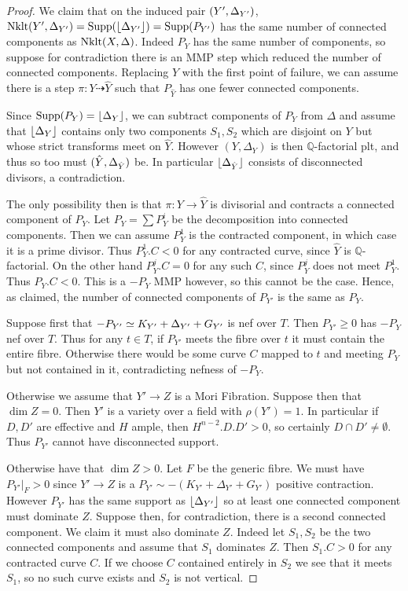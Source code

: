 \begin{proof}
	We claim that on the induced pair $(Y',\Delta_{Y'})$, $\textup{Nklt}(Y',\Delta_{Y'})=\text{Supp}(\lfloor \Delta_{Y'} \rfloor)=\text{Supp}(P_{Y'})$ has the same number of connected components as $\textup{Nklt}(X,\Delta)$. Indeed $P_{Y}$ has the same number of components, so suppose for contradiction there is an MMP step which reduced the number of connected components. Replacing $Y$ with the first point of failure, we can assume there is a step $\pi: Y \dashrightarrow \hat{Y}$ such that $P_{\hat{Y}}$ has one fewer connected components. 
	
	Since $\text{Supp}(P_{Y})=\lfloor \Delta_{Y} \rfloor$, we can subtract components of $P_{Y}$ from $\Delta$ and assume that $\lfloor \Delta_{Y} \rfloor$ contains only two components $S_{1}, S_{2}$ which are disjoint on $Y$ but whose strict transforms meet on $\hat{Y}$. However $(Y,\Delta_{Y})$ is then $\mathbb{Q}$-factorial plt, and thus so too must $(\hat{Y},\Delta_{\hat{Y}})$ be. In particular $\lfloor \Delta_{\hat{Y}} \rfloor$ consists of disconnected divisors, a contradiction. 
	
	The only possibility then is that $\pi: Y \to \hat{Y}$ is divisorial and contracts a connected component of $P_{Y}$. Let $P_{Y}=\sum P_{Y}^{i}$ be the decomposition into connected components. Then we can assume $P_{Y}^{1}$ is the contracted component, in which case it is a prime divisor. Thus $P_{Y}^{1}.C <0$ for any contracted curve, since $\hat{Y}$ is $\mathbb{Q}$-factorial. On the other hand $P_{Y}^{j}.C=0$ for any such $C$, since $P_{Y}^{j}$ does not meet $P_{Y}^{1}$. Thus $P_{Y}.C <0$. This is a $-P_{Y}$ MMP however, so this cannot be the case. Hence, as claimed, the number of connected components of $P_{Y'}$ is the same as $P_{Y}$.
	
	Suppose first that $-P_{Y'} \simeq K_{Y'}+\Delta_{Y'}+G_{Y'}$ is nef over $T$. Then $P_{Y'} \geq 0$ has $-P_{Y}$ nef over $T$. Thus for any $t \in T$, if $P_{Y'}$ meets the fibre over $t$ it must contain the entire fibre. Otherwise there would be some curve $C$ mapped to $t$ and meeting $P_{Y}$ but not contained in it, contradicting nefness of $-P_{Y}$.
	
	Otherwise we assume that $Y' \to Z$ is a Mori Fibration. Suppose then that $\dim Z=0$. Then $Y'$ is a variety over a field with $\rho(Y')=1$. In particular if $D,D'$ are effective and $H$ ample, then $H^{n-2}.D.D' >0$, so certainly $D\cap D' \neq \emptyset$. Thus $P_{Y'}$ cannot have disconnected support.
	
	Otherwise have that $\dim Z > 0 $. Let $F$ be the generic fibre. We must have $P_{Y'}|_{F}> 0$ since $Y' \to Z$ is a $P_{Y'}\sim -(K_{Y'}+\Delta_{Y'}+G_{Y'})$ positive contraction. However $P_{Y'}$ has the same support as $\lfloor \Delta_{Y'} \rfloor$ so at least one connected component must dominate $Z$. Suppose then, for contradiction, there is a second connected component. We claim it must also dominate $Z$. Indeed let $S_{1},S_{2}$ be the two connected components and assume that $S_{1}$ dominates $Z$. Then $S_{1}.C > 0$ for any contracted curve $C$. If we choose $C$ contained entirely in $S_{2}$ we see that it meets $S_{1}$, so no such curve exists and $S_{2}$ is not vertical.


\end{proof}
